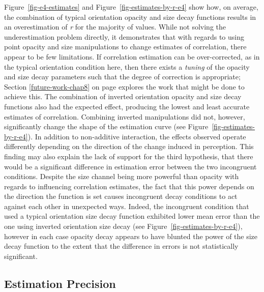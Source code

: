 \documentclass[../main.tex]{subfiles}
\begin{document}
Figure~\ref{fig-e4-estimates} and Figure~\ref{fig-estimates-by-r-e4}
show how, on average, the combination of typical orientation opacity and
size decay functions results in an overestimation of \emph{r} for the
majority of values. While not solving the underestimation problem
directly, it demonstrates that with regards to using point opacity and
size manipulations to change estimates of correlation, there appear to
be few limitations. If correlation estimation can be over-corrected, as
in the typical orientation condition here, then there exists a
\emph{tuning} of the opacity and size decay parameters such that the
degree of correction is appropriate; Section \ref{future-work-chap8} on
page \pageref{future-work-chap8} explores the work that might be done to
achieve this. The combination of inverted orientation opacity and size
decay functions also had the expected effect, producing the lowest and
least accurate estimates of correlation. Combining inverted
manipulations did not, however, significantly change the shape of the
estimation curve (see Figure~\ref{fig-estimates-by-r-e4}). In addition
to non-additive interaction, the effects observed operate differently
depending on the direction of the change induced in perception. This
finding may also explain the lack of support for the third hypothesis,
that there would be a significant difference in estimation error between
the two incongruent conditions. Despite the size channel being more
powerful than opacity with regards to influencing correlation estimates,
the fact that this power depends on the direction the function is set
causes incongruent decay conditions to act against each other in
unexpected ways. Indeed, the incongruent condition that used a typical
orientation size decay function exhibited lower mean error than the one
using inverted orientation size decay (see
Figure~\ref{fig-estimates-by-r-e4}), however in each case opacity decay
appears to have blunted the power of the size decay function to the
extent that the difference in errors is not statistically significant.

\subsection{Estimation Precision}\label{estimation-precision}
\end{document}
